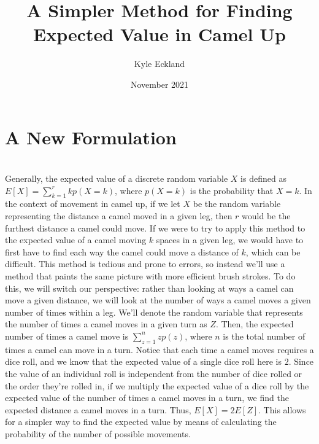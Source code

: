 \documentclass{article}
\title{A Simpler Method for Finding Expected Value in Camel Up}
\author{Kyle Eckland}
\date{November 2021}
\begin{document}
\maketitle

\section{A New Formulation}
\\ Generally, the expected value of a discrete random variable $X$ is defined as $E[X] = \sum_{k = 1}^{r}kp(X=k)$, where $p(X = k)$ is the probability that $X = k$. In the context of movement in camel up, if we let $X$ be the random variable representing the distance a camel moved in a given leg, then $r$ would be the furthest distance a camel could move. If we were to try to apply this method to the expected value of a camel moving $k$ spaces in a given leg, we would have to first have to find each way the camel could move a distance of $k$, which can be difficult. This method is tedious and prone to errors, so instead we'll use a method that paints the same picture with more efficient brush strokes. To do this, we will switch our perspective: rather than looking at ways a camel can move a given distance, we will look at the number of ways a camel moves a given number of times within a leg. We'll denote the random variable that represents the number of times a camel moves in a given turn as $Z$. Then, the expected number of times a camel move is $\sum_{z=1}^{n}zp(z)$, where $n$ is the total number of times a camel can move in a turn. Notice that each time a camel moves requires a dice roll, and we know that the expected value of a single dice roll here is $2$. Since the value of an individual roll is independent from the number of dice rolled or the order they're rolled in, if we multiply the expected value of a dice roll by the expected value of the number of times a camel moves in a turn, we find the expected distance a camel moves in a turn. Thus, $E[X] = 2E[Z]$. This allows for a simpler way to find the expected value by means of calculating the probability of the number of possible movements.
\end{document}
